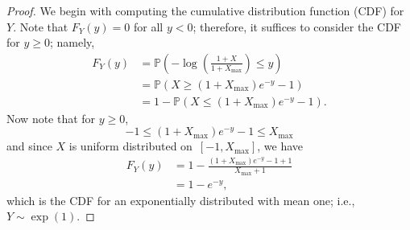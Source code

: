 \begin{proof}
    We begin with computing the cumulative distribution function (CDF) for $Y$. Note that $F_Y(y) = 0$ for all $y < 0$; therefore, it suffices to consider the CDF for $y \ge 0 $; namely,
\begin{align*}
	F_Y(y)
	&= \mathbb{P} \left(  - \log \left( {\frac{{1 + X}}{1 + X_{\max } }} \right) \le y \right) 
	\\ 
	&= \mathbb{P}\left( {X \ge \left( {1 + {X_{\max }}} \right){e^{ - y}} - 1} \right)
	\\ 
	&= 1 - \mathbb{P}\left( {X \le \left( {1 + {X_{\max }}} \right){e^{ - y}} - 1} \right).
\end{align*}
Now note that for $y \ge 0$, 
$$ - 1 \le \left( {1 + {X_{\max }}} \right){e^{ - y}} - 1 \le {X_{\max }}$$ 
and since $X $ is uniform distributed on~$[-1, X_{\max}]$, we have
\begin{align*}
    F_Y(y)
    & = 1 - \frac{{\left( 1 + X_{\max} \right){e^{ - y}} - 1 + 1}}{X_{\max } + 1}\\
    &= 1 - e^{ - y},
\end{align*}
which is the CDF for an exponentially distributed with mean one; i.e., $Y \sim \exp(1).$
\end{proof}   


